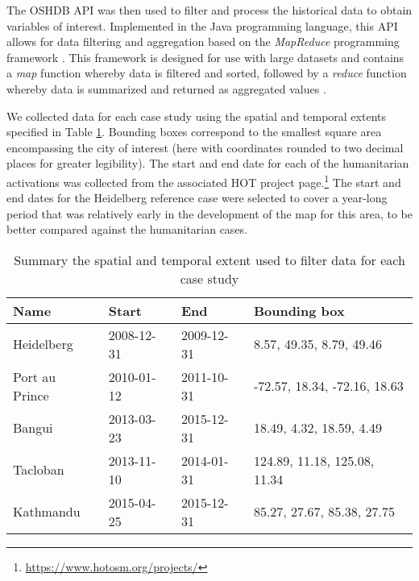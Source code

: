 The OSHDB API \parencite{raifer_oshdb_2019} was then used to filter and process the historical data to obtain variables of interest.  Implemented in the Java programming language, this API allows for data filtering and aggregation based on the \textit{MapReduce} programming framework \parencite{raifer_oshdb_2019}. This framework is designed for use with large datasets and contains a \textit{map} function whereby data is filtered and sorted, followed by a \textit{reduce} function whereby data is summarized and returned as aggregated values \parencite{dean_mapreduce_2008}.

We collected data for each case study using the spatial and temporal extents specified in Table \ref{tab:cases}. Bounding boxes correspond to the smallest square area encompassing the city of interest (here with coordinates rounded to two decimal places for greater legibility). The start and end date for each of the humanitarian activations was collected from the associated HOT project page.\footnote{\url{https://www.hotosm.org/projects/}} The start and end dates for the Heidelberg reference case were selected to cover a year-long period that was relatively early in the development of the map for this area, to be better compared against the humanitarian cases. 

\begin{table}
\centering
\caption{Summary the spatial and temporal extent used to filter data for each case study}
\label{tab:cases}
\begin{tabular}{llll}
\toprule
Name                     & Start      & End        & Bounding box                 \\
\midrule
Heidelberg               & 2008-12-31 & 2009-12-31 & 8.57, 49.35, 8.79, 49.46     \\
Port au Prince         & 2010-01-12 & 2011-10-31 & -72.57, 18.34, -72.16, 18.63 \\
Bangui & 2013-03-23 & 2015-12-31 & 18.49, 4.32, 18.59, 4.49     \\
Tacloban           & 2013-11-10 & 2014-01-31 & 124.89, 11.18, 125.08, 11.34 \\
Kathmandu         & 2015-04-25 & 2015-12-31 & 85.27, 27.67, 85.38, 27.75  \\
\bottomrule
\end{tabular}
\end{table}


